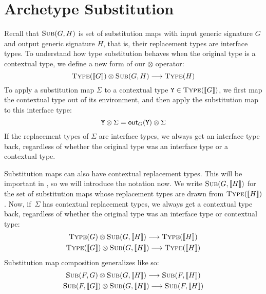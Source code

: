 \documentclass[../generics]{subfiles}
\begin{document}
\section{Archetype Substitution}\label{archetypesubst}

Recall that $\textsc{Sub}({G, H})$ is set of substitution maps with input generic signature $G$ and output generic signature $H$, that is, their replacement types are interface types. To understand how type substitution behaves when the original type is a contextual type, we define a new form of our $\otimes$ operator:
\[
\textsc{Type}({[\![G]\!]})\otimes\textsc{Sub}({G, H})\longrightarrow\textsc{Type}({H})
\]
To apply a substitution map $\Sigma$ to a contextual type $\texttt{Y}\in\textsc{Type}({[\![G]\!]})$, we first map the contextual type out of its environment, and then apply the substitution map to this interface type:
\[\texttt{Y}\otimes \Sigma = \mathsf{out}_G(\texttt{Y})\otimes \Sigma\]
If the replacement types of $\Sigma$ are interface types, we always get an interface type back, regardless of whether the original type was an interface type or a contextual type.

Substitution maps can also have contextual replacement types. This will be important in , so we will introduce the notation now. We write $\textsc{Sub}({G, [\![H]\!]})$ for the set of substitution maps whose replacement types are drawn from $\textsc{Type}({[\![H]\!]})$. Now, if~$\Sigma$ has contextual replacement types, we always get a contextual type back, regardless of whether the original type was an interface type or contextual type:
\begin{gather*}
\TypeObj{G}\otimes\SubMapObj{G}{\EquivClass{H}}\longrightarrow\TypeObj{\EquivClass{H}}\\
\TypeObj{\EquivClass{G}}\otimes\SubMapObj{G}{\EquivClass{H}}\longrightarrow\TypeObj{\EquivClass{H}}
\end{gather*}
Substitution map composition generalizes like so:
\begin{gather*}
\SubMapObj{F}{G}\otimes\SubMapObj{G}{\EquivClass{H}}\longrightarrow\SubMapObj{F}{\EquivClass{H}}\\
\SubMapObj{F}{\EquivClass{G}}\otimes\SubMapObj{G}{\EquivClass{H}}\longrightarrow\SubMapObj{F}{\EquivClass{H}}
\end{gather*}
\end{document}
